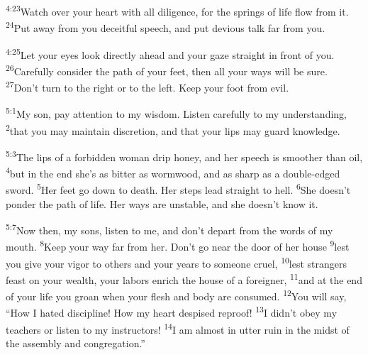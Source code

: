 \documentclass[openany,12pt,english]{book}
\newenvironment{para}{\par\pretolerance=100\tolerance=200\setlength{\emergencystretch}{0.6em}\relax}{\par}
\begin{document}
\begin{para}
    \textsuperscript{4:23}\thinspace{}Watch o\-ver your heart with all dil\-i\-gence, for the springs of life flow from it.
    \textsuperscript{24}\thinspace{}Put a\-way from you de\-ceit\-ful speech, and put de\-vi\-ous talk far from you.
\end{para}

\begin{para}
    \textsuperscript{4:25}\thinspace{}Let your eyes look di\-rect\-ly a\-head and your gaze straight in front of you.
    \textsuperscript{26}\thinspace{}Care\-ful\-ly con\-sid\-er the path of your feet, then all your ways will be sure.
    \textsuperscript{27}\thinspace{}Don't turn to the right or to the left. Keep your foot from evil.
\end{para}

\bigskip{}

\begin{para}
    \textsuperscript{5:1}\thinspace{}My son, pay at\-ten\-tion to my wis\-dom. Lis\-ten care\-ful\-ly to my un\-der\-stand\-ing,
    \textsuperscript{2}\thinspace{}that you may main\-tain dis\-cre\-tion, and that your lips may guard knowl\-edge.
\end{para}

\begin{para}
    \textsuperscript{5:3}\thinspace{}The lips of a for\-bid\-den wom\-an drip hon\-ey, and her speech is smooth\-er than oil,
    \textsuperscript{4}\thinspace{}but in the end she's as bit\-ter as worm\-wood, and as sharp as a double-edged sword.
    \textsuperscript{5}\thinspace{}Her feet go down to death. Her steps lead straight to hell.
    \textsuperscript{6}\thinspace{}She does\-n't pon\-der the path of life. Her ways are un\-sta\-ble, and she does\-n't know it.
\end{para}

\begin{para}
    \textsuperscript{5:7}\thinspace{}Now then, my sons, lis\-ten to me, and don't de\-part from the words of my mouth.
    \textsuperscript{8}\thinspace{}Keep your way far from her. Don't go near the door of her house
    \textsuperscript{9}\thinspace{}lest you give your vig\-or to others and your years to some\-one cru\-el,
    \textsuperscript{10}\thinspace{}lest strangers feast on your wealth, your labors en\-rich the house of a for\-eign\-er,
    \textsuperscript{11}\thinspace{}and at the end of your life you groan when your flesh and bod\-y are con\-sumed.
    \textsuperscript{12}\thinspace{}You will say, “How I hat\-ed dis\-ci\-pline! How my heart de\-spised re\-proof!
    \textsuperscript{13}\thinspace{}I did\-n't o\-bey my teachers or lis\-ten to my instructors!
    \textsuperscript{14}\thinspace{}I am al\-most in ut\-ter ru\-in in the midst of the as\-sem\-bly and con\-gre\-ga\-tion.”
\end{para}
\end{document}
